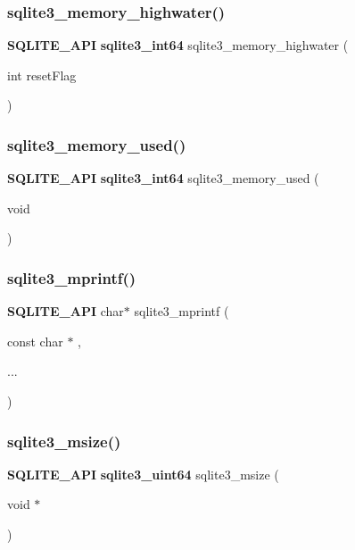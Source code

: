 \subsubsection{sqlite3\_memory\_highwater()}
{\footnotesize\ttfamily \textbf{ S\+Q\+L\+I\+T\+E\+\_\+\+A\+PI} \textbf{ sqlite3\+\_\+int64} sqlite3\+\_\+memory\+\_\+highwater (\begin{DoxyParamCaption}\item[{int}]{reset\+Flag }\end{DoxyParamCaption})}

\mbox{\label{sqlite3_8h_abedb79a850df1979a693632736616f3f}} 
\subsubsection{sqlite3\_memory\_used()}
{\footnotesize\ttfamily \textbf{ S\+Q\+L\+I\+T\+E\+\_\+\+A\+PI} \textbf{ sqlite3\+\_\+int64} sqlite3\+\_\+memory\+\_\+used (\begin{DoxyParamCaption}\item[{void}]{ }\end{DoxyParamCaption})}

\mbox{\label{sqlite3_8h_a9533933e57f7ccbb48c32041ce3a8862}} 
\subsubsection{sqlite3\_mprintf()}
{\footnotesize\ttfamily \textbf{ S\+Q\+L\+I\+T\+E\+\_\+\+A\+PI} char$\ast$ sqlite3\+\_\+mprintf (\begin{DoxyParamCaption}\item[{const char $\ast$}]{,  }\item[{}]{... }\end{DoxyParamCaption})}

\mbox{\label{sqlite3_8h_a47e65b9262d63a141f95a4b32bcd044b}} 
\subsubsection{sqlite3\_msize()}
{\footnotesize\ttfamily \textbf{ S\+Q\+L\+I\+T\+E\+\_\+\+A\+PI} \textbf{ sqlite3\+\_\+uint64} sqlite3\+\_\+msize (\begin{DoxyParamCaption}\item[{void $\ast$}]{ }\end{DoxyParamCaption})}

